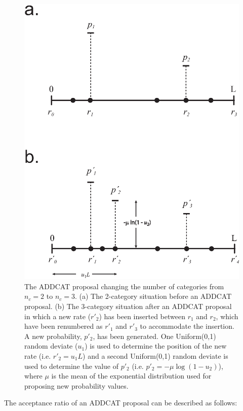 \documentclass[12pt]{article}
\newcommand{\ncat}{n_c}
\newcommand{\newprobmean}{\mu}
\begin{document}
%
%
\begin{figure}
\centering
\hfil\includegraphics[scale=0.7]{addcat.eps}\hfil
\caption{The ADDCAT proposal changing the number of categories from $\ncat = 2$ to $\ncat = 3$. (a) The 2-category situation before an ADDCAT proposal. (b) The 3-category situation after an ADDCAT proposal in which a new rate ($r'_2$) has been inserted between $r_1$ and $r_2$, which have been renumbered as $r'_1$ and $r'_3$ to accommodate the insertion. A new probability, $p'_2$, has been generated. One Uniform(0,1) random deviate ($u_1$) is used to determine the position of the new rate (i.e. $r'_2 = u_1 L$) and a second Uniform(0,1) random deviate is used to determine the value of $p'_2$ (i.e. $p'_2 = -\newprobmean \log(1 - u_2)$), where $\newprobmean$ is the mean of the exponential distribution used for proposing new probability values.}
\label{addcat}
\end{figure}

The acceptance ratio of an ADDCAT proposal can be described as follows:
\end{document}
